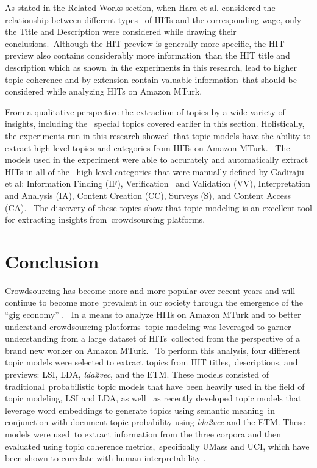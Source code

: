 \documentclass[letterpaper,12pt]{article}
\begin{document}
As stated in the Related Works section, when Hara et al. considered the relationship between different types \
of HITs and the corresponding wage, only the Title and Description were considered while drawing their conclusions.\
Although the HIT preview is generally more specific, the HIT preview also contains considerably more information\
than the HIT title and description which as shown\
in the experiments in this research, lead to higher topic coherence and by extension contain valuable information\
that should be considered while analyzing HITs on Amazon MTurk. 

From a qualitative perspective the extraction of topics by a wide variety of insights, including the \
special topics covered earlier in this section. Holistically, the experiments run in this research showed\
that topic models have the ability to extract high-level topics and categories from HITs on Amazon MTurk. \
The models used in the experiment were able to accurately and automatically extract HITs in all of the \
high-level categories that were manually defined by Gadiraju et al: Information Finding (IF), Verification \
and Validation (VV), Interpretation and Analysis (IA), Content Creation (CC), Surveys (S), and Content Access (CA). \
The discovery of these topics show that topic modeling is an excellent tool for extracting insights from\
crowdsourcing platforms.

\chapter{Conclusion}
Crowdsourcing has become more and more popular over recent years and will continue to become more\
prevalent in our society through the emergence of the ``gig economy'' \cite{kuek2015global}. \ 
In a means to analyze HITs on Amazon MTurk and to better understand crowdsourcing platforms\
topic modeling was leveraged to garner understanding from a large dataset of HITs\
collected from the perspective of a brand new worker on Amazon MTurk. \
To perform this analysis, four different topic models were selected to extract topics from HIT titles,\
descriptions, and previews: LSI, LDA, \emph{lda2vec}, and the ETM. These models consisted of traditional\
probabilistic topic models that have been heavily used in the field of topic modeling, LSI and LDA, as well \
as recently developed topic models that leverage word embeddings to generate topics using semantic meaning\
in conjunction with document-topic probability using \emph{lda2vec} and the ETM. These models were used\
to extract information from the three corpora and then evaluated using topic coherence metrics,\
specifically UMass and UCI, which have been shown to correlate with human interpretability \cite{newman2010automatic,mimno2011optimizing}.
\end{document}
